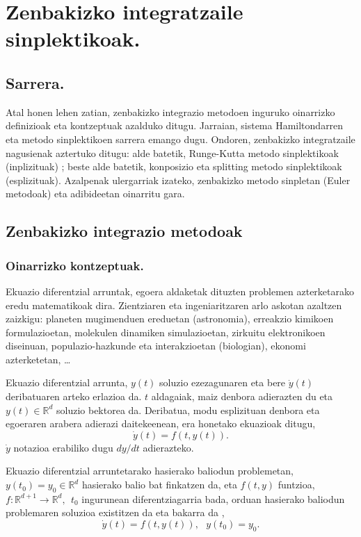 \chapter{Zenbakizko integratzaile sinplektikoak.}

\section{Sarrera.}


Atal honen lehen zatian, zenbakizko integrazio metodoen inguruko oinarrizko definizioak eta kontzeptuak azalduko ditugu. 
Jarraian, sistema Hamiltondarren eta metodo sinplektikoen sarrera emango dugu. Ondoren, zenbakizko integratzaile nagusienak aztertuko ditugu: alde batetik, Runge-Kutta metodo sinplektikoak (inplizituak) ; beste alde batetik, konposizio eta splitting metodo sinplektikoak (esplizituak). Azalpenak ulergarriak izateko, zenbakizko metodo sinpletan (Euler metodoak) eta adibideetan oinarritu gara. 

\section{Zenbakizko integrazio metodoak}

\subsection{Oinarrizko kontzeptuak.}

Ekuazio diferentzial arruntak, egoera aldaketak dituzten problemen azterketarako eredu matematikoak dira. Zientziaren eta ingeniaritzaren arlo askotan azaltzen zaizkigu: planeten mugimenduen ereduetan (astronomia), erreakzio kimikoen formulazioetan, molekulen dinamiken simulazioetan, zirkuitu elektronikoen diseinuan, populazio-hazkunde eta interakzioetan (biologian), ekonomi azterketetan, \ldots  

Ekuazio diferentzial arrunta, $y(t)$ soluzio ezezagunaren eta bere $\dot{y}(t)$ deribatuaren arteko erlazioa da. $t$ aldagaiak, maiz denbora adierazten du eta $y(t) \in \mathbb{R}^{d}$ soluzio bektorea da. Deribatua, modu esplizituan denbora eta egoeraren arabera  adierazi daitekeenean, era honetako ekuazioak ditugu,
\begin{equation}
 \label{eq:201}
\dot{y}(t)=f(t,y(t)). 
\end{equation} 
$\dot{y}$ notazioa erabiliko dugu $dy/dt$ adierazteko.

Ekuazio diferentzial arruntetarako hasierako baliodun problemetan,  $y(t_0)=y_0 \in \mathbb{R}^d$ hasierako balio bat finkatzen da, eta $f(t,y)$ funtzioa, $f: \mathbb{R}^{d+1} \longrightarrow \mathbb{R}^d, \ \ t_0$ ingurunean diferentziagarria bada, orduan hasierako baliodun problemaren soluzioa existitzen da eta bakarra da \cite{Hairer2006},
\begin{equation}
 \label{eq:ivp}
\dot{y}(t)=f(t,y(t)), \ \ \ y(t_0)=y_0.
\end{equation} 

